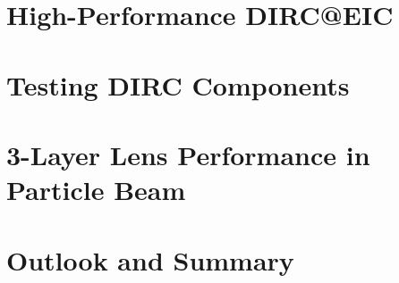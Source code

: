 \documentclass[12pt]{report}
\numberwithin{equation}{chapter}
\begin{document}
\chapter{High-Performance DIRC@EIC}
%
\chapter{Testing DIRC Components}
%
\chapter{3-Layer Lens Performance in Particle Beam}
%
\chapter{Outlook and Summary}



{}



\appendix


\newpage


\vitapage
\end{document}
